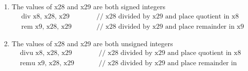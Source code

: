 \documentclass[12pt]{article}
\begin{document}
\begin{itemize}
            \begin{enumerate}
                \item The values of x28 and x29 are both signed integers
                    \begin{align*}
                        &\text{div x8, x28, x29}\qquad &&\text{// x28 divided by x29 and place quotient in x8} \\
                        &\text{rem x9, x28, x29}\qquad &&\text{// x28 divided by x29 and place remainder in x9}
                    \end{align*}
                \item The values of x28 and x29 are both unsigned integers
                    \begin{align*}
                        &\text{divu x8, x28, x29}\qquad &&\text{// x28 divided by x29 and place quotient in x8} \\
                        &\text{remu x9, x28, x29}\qquad &&\text{// x28 divided by x29 and place remainder in x9}
                    \end{align*}
            \end{enumerate}
    \end{itemize}
\end{document}
